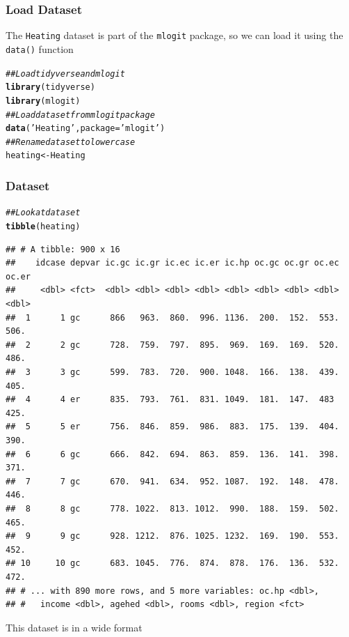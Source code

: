 \documentclass{beamer}\usepackage[]{graphicx}\usepackage[]{xcolor}
\makeatletter
\newcommand{\hlstr}[1]{\textcolor[rgb]{0.192,0.494,0.8}{#1}}%
\newcommand{\hlcom}[1]{\textcolor[rgb]{0.678,0.584,0.686}{\textit{#1}}}%
\newcommand{\hlstd}[1]{\textcolor[rgb]{0.345,0.345,0.345}{#1}}%
\newcommand{\hlkwb}[1]{\textcolor[rgb]{0.69,0.353,0.396}{#1}}%
\newcommand{\hlkwc}[1]{\textcolor[rgb]{0.333,0.667,0.333}{#1}}%
\newcommand{\hlkwd}[1]{\textcolor[rgb]{0.737,0.353,0.396}{\textbf{#1}}}%
\newenvironment{kframe}{%
 \def\at@end@of@kframe{}%
 \ifinner\ifhmode%
  \def\at@end@of@kframe{\end{minipage}}%
  \begin{minipage}{\columnwidth}%
 \fi\fi%
 \def\FrameCommand##1{\hskip\@totalleftmargin \hskip-\fboxsep
 \colorbox{shadecolor}{##1}\hskip-\fboxsep
     \hskip-\linewidth \hskip-\@totalleftmargin \hskip\columnwidth}%
 \MakeFramed {\advance\hsize-\width
   \@totalleftmargin\z@ \linewidth\hsize
   \@setminipage}}%
 {\par\unskip\endMakeFramed%
 \at@end@of@kframe}
\newenvironment{knitrout}{}{} %
\makeatother
\begin{document}
\begin{frame}[fragile]\frametitle{Load Dataset}
    The \texttt{Heating} dataset is part of the \texttt{mlogit} package, so we can load it using the \texttt{data()} function \\
\begin{knitrout}\footnotesize
{}\color{fgcolor}\begin{kframe}
\begin{alltt}
\hlcom{## Load tidyverse and mlogit}
\hlkwd{library}\hlstd{(tidyverse)}
\hlkwd{library}\hlstd{(mlogit)}
\hlcom{## Load dataset from mlogit package}
\hlkwd{data}\hlstd{(}\hlstr{'Heating'}\hlstd{,} \hlkwc{package} \hlstd{=} \hlstr{'mlogit'}\hlstd{)}
\hlcom{## Rename dataset to lowercase}
\hlstd{heating} \hlkwb{<-} \hlstd{Heating}
\end{alltt}
\end{kframe}
\end{knitrout}
\end{frame}

\begin{frame}[fragile]\frametitle{Dataset}
\begin{knitrout}\footnotesize
{}\color{fgcolor}\begin{kframe}
\begin{alltt}
\hlcom{## Look at dataset}
\hlkwd{tibble}\hlstd{(heating)}
\end{alltt}
\begin{verbatim}
## # A tibble: 900 x 16
##    idcase depvar ic.gc ic.gr ic.ec ic.er ic.hp oc.gc oc.gr oc.ec oc.er
##     <dbl> <fct>  <dbl> <dbl> <dbl> <dbl> <dbl> <dbl> <dbl> <dbl> <dbl>
##  1      1 gc      866   963.  860.  996. 1136.  200.  152.  553.  506.
##  2      2 gc      728.  759.  797.  895.  969.  169.  169.  520.  486.
##  3      3 gc      599.  783.  720.  900. 1048.  166.  138.  439.  405.
##  4      4 er      835.  793.  761.  831. 1049.  181.  147.  483   425.
##  5      5 er      756.  846.  859.  986.  883.  175.  139.  404.  390.
##  6      6 gc      666.  842.  694.  863.  859.  136.  141.  398.  371.
##  7      7 gc      670.  941.  634.  952. 1087.  192.  148.  478.  446.
##  8      8 gc      778. 1022.  813. 1012.  990.  188.  159.  502.  465.
##  9      9 gc      928. 1212.  876. 1025. 1232.  169.  190.  553.  452.
## 10     10 gc      683. 1045.  776.  874.  878.  176.  136.  532.  472.
## # ... with 890 more rows, and 5 more variables: oc.hp <dbl>,
## #   income <dbl>, agehed <dbl>, rooms <dbl>, region <fct>
\end{verbatim}
\end{kframe}
\end{knitrout}
    \vspace{2ex}
    This dataset is in a wide format
\end{frame}
\end{document}
